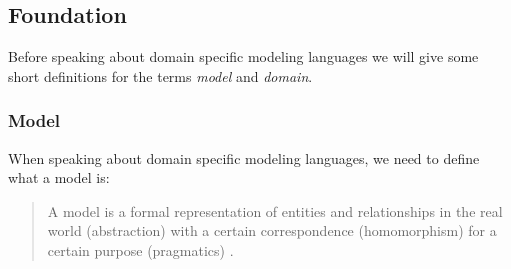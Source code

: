 \documentclass[runningheads,a4paper]{llncs}
\begin{document}

\subsection{Foundation}
\label{subsec:introduction}
Before speaking about domain specific modeling languages we will give some short definitions for the  
terms \emph{model} and \emph{domain}.

\subsubsection{Model}
% 
%  
%  
  When speaking about domain specific modeling languages, we need to define what a model is:
  
  \begin{quote}
   A model is a formal representation of entities and relationships in the real world (abstraction) 
  with a certain correspondence (homomorphism) for a certain purpose (pragmatics) \cite{stachowiak1973allgemeine}.
  \end{quote}
  
\end{document}

